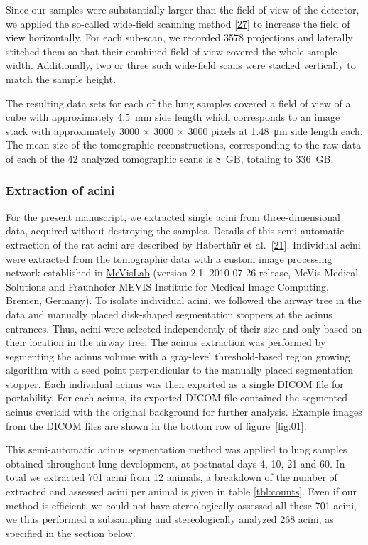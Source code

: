 \documentclass[
  american,
]{article}
\begin{document}
Since our samples were substantially larger than the field of view of the detector, we applied the so-called wide-field scanning method {[}\protect\hyperlink{ref-VELl7OiR}{27}{]} to increase the field of view horizontally.
For each sub-scan, we recorded 3578 projections and laterally stitched them so that their combined field of view covered the whole sample width.
Additionally, two or three such wide-field scans were stacked vertically to match the sample height.

The resulting data sets for each of the lung samples covered a field of view of a cube with approximately 4.5~mm side length which corresponds to an image stack with approximately 3000 × 3000 × 3000 pixels at 1.48~μm side length each.
The mean size of the tomographic reconstructions, corresponding to the raw data of each of the 42 analyzed tomographic scans is 8~GB, totaling to 336~GB.

\hypertarget{extraction-of-acini}{%
\subsubsection{Extraction of acini}\label{extraction-of-acini}}

For the present manuscript, we extracted single acini from three-dimensional data, acquired without destroying the samples.
Details of this semi-automatic extraction of the rat acini are described by Haberthür et al.~{[}\protect\hyperlink{ref-7YLeeyu}{21}{]}.
Individual acini were extracted from the tomographic data with a custom image processing network established in \href{https://www.mevislab.de/}{MeVisLab} (version 2.1, 2010-07-26 release, MeVis Medical Solutions and Fraunhofer MEVIS-Institute for Medical Image Computing, Bremen, Germany).
To isolate individual acini, we followed the airway tree in the data and manually placed disk-shaped segmentation stoppers at the acinus entrances.
Thus, acini were selected independently of their size and only based on their location in the airway tree.
The acinus extraction was performed by segmenting the acinus volume with a gray-level threshold-based region growing algorithm with a seed point perpendicular to the manually placed segmentation stopper.
Each individual acinus was then exported as a single DICOM file for portability.
For each acinus, its exported DICOM file contained the segmented acinus overlaid with the original background for further analysis.
Example images from the DICOM files are shown in the bottom row of figure~\ref{fig:01}.

This semi-automatic acinus segmentation method was applied to lung samples obtained throughout lung development, at postnatal days 4, 10, 21 and 60.
In total we extracted 701 acini from 12 animals, a breakdown of the number of extracted and assessed acini per animal is given in table \ref{tbl:counts}.
Even if our method is efficient, we could not have stereologically assessed all these 701 acini, we thus performed a subsampling and stereologically analyzed 268 acini, as specified in the section below.
\end{document}
